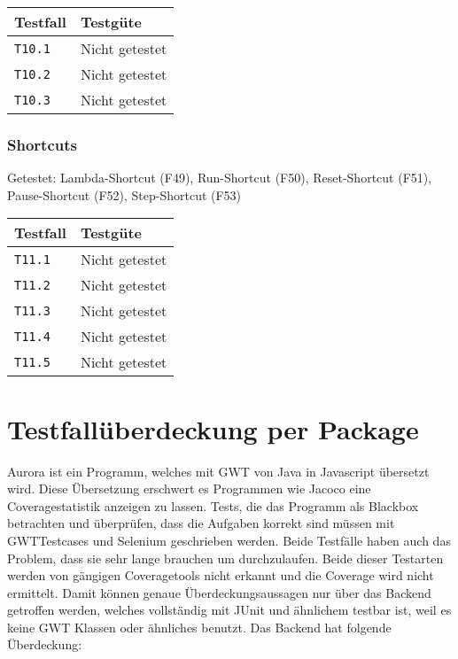 \documentclass[parskip=full,11pt,twoside]{scrartcl}
\newcommand{\testline}[2]{
    \texttt{#1} & 
    \ifthenelse{\equal{#2}{Nicht getestet}}
        {\cellcolor{red!20}}
        {}
    \ifthenelse{\equal{#2}{Manuell getestet}}
        {\cellcolor{LimeGreen!20}}
        {}
    \ifthenelse{\equal{#2}{Automatisiert getestet}}
        {\cellcolor{green!20}}
        {}
    #2 \\ \hline
}
\begin{document}
    \label{shortcuts}
    \begin{center}
        \begin{tabular}{ p{9cm} p{4cm}}
            Testfall & Testgüte \\ \hline
            \testline{T10.1}{Nicht getestet}
            \testline{T10.2}{Nicht getestet}
            \testline{T10.3}{Nicht getestet}
        \end{tabular}
    \end{center}

\subsubsection{Shortcuts}
    Getestet:
    Lambda-Shortcut (F49),
    Run-Shortcut (F50),
    Reset-Shortcut (F51),
    Pause-Shortcut (F52),
    Step-Shortcut (F53)

    \label{shortcuts}
    \begin{center}
        \begin{tabular}{ p{9cm} p{4cm}}
            Testfall & Testgüte \\ \hline
            \testline{T11.1}{Nicht getestet}
            \testline{T11.2}{Nicht getestet}
            \testline{T11.3}{Nicht getestet}
            \testline{T11.4}{Nicht getestet}
            \testline{T11.5}{Nicht getestet}
        \end{tabular}
    \end{center}

\section{Testfallüberdeckung per Package}
    Aurora ist ein Programm, welches mit GWT von Java in Javascript übersetzt wird.
    Diese Übersetzung erschwert es Programmen wie Jacoco eine Coveragestatistik anzeigen zu lassen.
    Tests, die das Programm als Blackbox betrachten und überprüfen, dass die Aufgaben korrekt sind müssen
    mit GWTTestcases und Selenium geschrieben werden.
    Beide Testfälle haben auch das Problem, dass sie sehr lange brauchen um durchzulaufen.
    Beide dieser Testarten werden von gängigen Coveragetools nicht erkannt und die Coverage wird nicht
    ermittelt.
    Damit können genaue Überdeckungsaussagen nur über das Backend getroffen werden, welches vollständig mit JUnit und ähnlichem
    testbar ist, weil es keine GWT Klassen oder ähnliches benutzt.
	Das Backend hat folgende Überdeckung:
	
\end{document}
